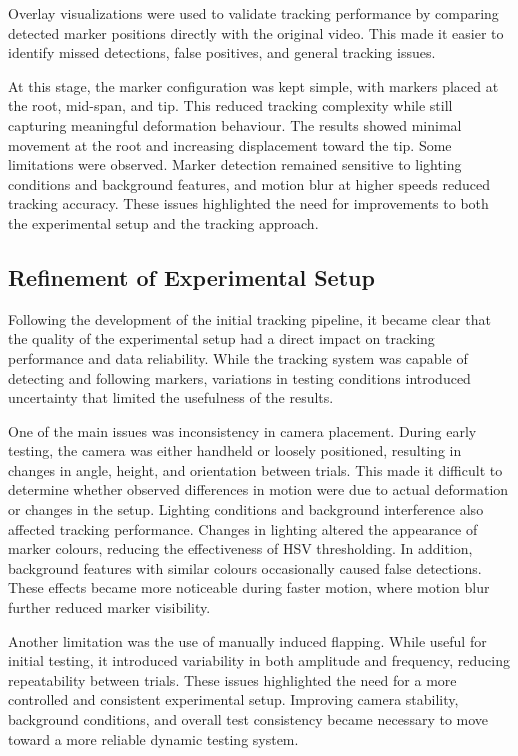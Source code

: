 Overlay visualizations were used to validate tracking performance by comparing detected marker positions directly with the original video. This made it easier to identify missed detections, false positives, and general tracking issues.
 
At this stage, the marker configuration was kept simple, with markers placed at the root, mid-span, and tip. This reduced tracking complexity while still capturing meaningful deformation behaviour. The results showed minimal movement at the root and increasing displacement toward the tip. Some limitations were observed. Marker detection remained sensitive to lighting conditions and background features, and motion blur at higher speeds reduced tracking accuracy. These issues highlighted the need for improvements to both the experimental setup and the tracking approach.
 
\subsection{Refinement of Experimental Setup}
 
Following the development of the initial tracking pipeline, it became clear that the quality of the experimental setup had a direct impact on tracking performance and data reliability. While the tracking system was capable of detecting and following markers, variations in testing conditions introduced uncertainty that limited the usefulness of the results.
 
One of the main issues was inconsistency in camera placement. During early testing, the camera was either handheld or loosely positioned, resulting in changes in angle, height, and orientation between trials. This made it difficult to determine whether observed differences in motion were due to actual deformation or changes in the setup. Lighting conditions and background interference also affected tracking performance. Changes in lighting altered the appearance of marker colours, reducing the effectiveness of HSV thresholding. In addition, background features with similar colours occasionally caused false detections. These effects became more noticeable during faster motion, where motion blur further reduced marker visibility.
 
Another limitation was the use of manually induced flapping. While useful for initial testing, it introduced variability in both amplitude and frequency, reducing repeatability between trials. These issues highlighted the need for a more controlled and consistent experimental setup. Improving camera stability, background conditions, and overall test consistency became necessary to move toward a more reliable dynamic testing system.
 
